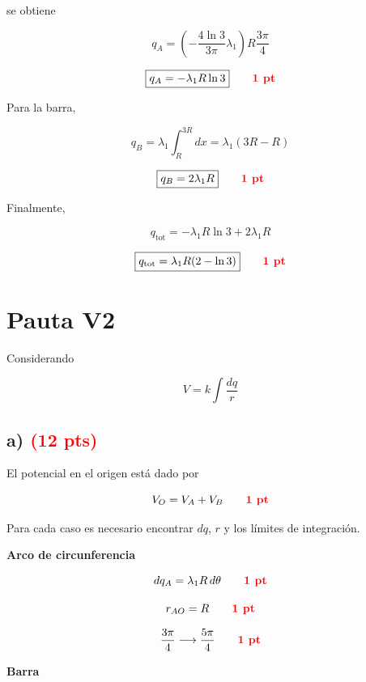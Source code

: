 \documentclass[12pt]{article}
\begin{document}
se obtiene

\[
q_A
=
\left(
-\frac{4\ln3}{3\pi}\lambda_1
\right)
R\frac{3\pi}{4}
\]

\[
\boxed{
q_A=-\lambda_1R\ln3
}
\qquad
\textcolor{red}{\textbf{1 pt}}
\]

Para la barra,

\[
q_B
=
\lambda_1
\int_R^{3R}dx
=
\lambda_1(3R-R)
\]

\[
\boxed{
q_B=2\lambda_1R
}
\qquad
\textcolor{red}{\textbf{1 pt}}
\]

Finalmente,

\[
q_{\text{tot}}
=
-\lambda_1R\ln3+2\lambda_1R
\]

\[
\boxed{
q_{\text{tot}}
=
\lambda_1R(2-\ln3)
}
\qquad
\textcolor{red}{\textbf{1 pt}}
\]

\newpage


\section*{Pauta V2}

Considerando

\[
V=k\int\frac{dq}{r}
\]

\subsection*{a) \hfill \textcolor{red}{\textbf{(12 pts)}}}

El potencial en el origen está dado por

\[
V_O=V_A+V_B
\qquad
\textcolor{red}{\textbf{1 pt}}
\]

Para cada caso es necesario encontrar $dq$, $r$ y los límites de integración.

\vspace{0.3cm}

\textbf{Arco de circunferencia}

\[
dq_A
=
\lambda_1R\,d\theta
\qquad
\textcolor{red}{\textbf{1 pt}}
\]

\[
r_{AO}=R
\qquad
\textcolor{red}{\textbf{1 pt}}
\]

\[
\frac{3\pi}{4}
\longrightarrow
\frac{5\pi}{4}
\qquad
\textcolor{red}{\textbf{1 pt}}
\]

\vspace{0.3cm}

\textbf{Barra}
\end{document}

